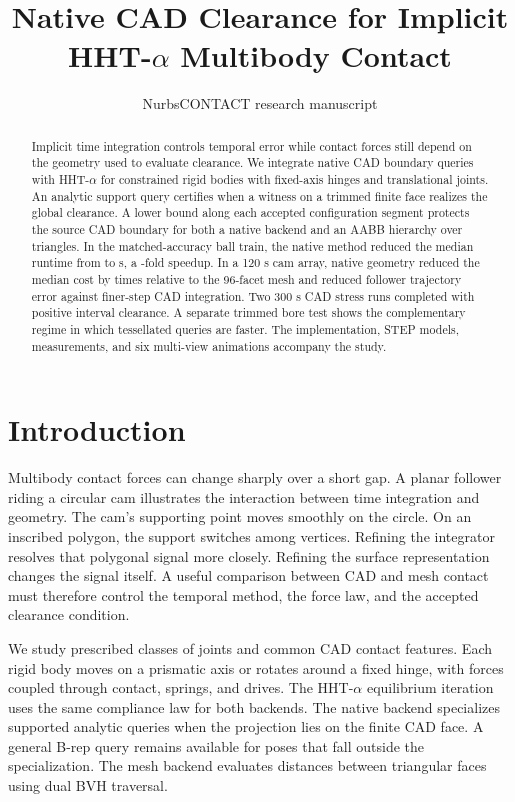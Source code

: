 \documentclass[10pt,a4paper]{article}
\title{\textbf{Native CAD Clearance for Implicit HHT-$\alpha$ Multibody Contact}}
\author{NurbsCONTACT research manuscript}
\date{}
\begin{document}
\maketitle

\begin{abstract}
Implicit time integration controls temporal error while contact forces still depend on the geometry used to evaluate clearance. We integrate native CAD boundary queries with HHT-$\alpha$ for constrained rigid bodies with fixed-axis hinges and translational joints. An analytic support query certifies when a witness on a trimmed finite face realizes the global clearance. A lower bound along each accepted configuration segment protects the source CAD boundary for both a native backend and an AABB hierarchy over triangles. In the matched-accuracy ball train, the native method reduced the median runtime from \TrainMeshTime{} to \TrainCadTime{} s, a \TrainGain{}-fold speedup. In a 120 s cam array, native geometry reduced the median cost by \CamFineGain{} times relative to the 96-facet mesh and reduced follower trajectory error against finer-step CAD integration. Two 300 s CAD stress runs completed with positive interval clearance. A separate trimmed bore test shows the complementary regime in which tessellated queries are faster. The implementation, STEP models, measurements, and six multi-view animations accompany the study.
\end{abstract}

\section{Introduction}

Multibody contact forces can change sharply over a short gap. A planar follower riding a circular cam illustrates the interaction between time integration and geometry. The cam's supporting point moves smoothly on the circle. On an inscribed polygon, the support switches among vertices. Refining the integrator resolves that polygonal signal more closely. Refining the surface representation changes the signal itself. A useful comparison between CAD and mesh contact must therefore control the temporal method, the force law, and the accepted clearance condition.

We study prescribed classes of joints and common CAD contact features. Each rigid body moves on a prismatic axis or rotates around a fixed hinge, with forces coupled through contact, springs, and drives. The HHT-$\alpha$ equilibrium iteration uses the same compliance law for both backends. The native backend specializes supported analytic queries when the projection lies on the finite CAD face. A general B-rep query remains available for poses that fall outside the specialization. The mesh backend evaluates distances between triangular faces using dual BVH traversal.
\end{document}
